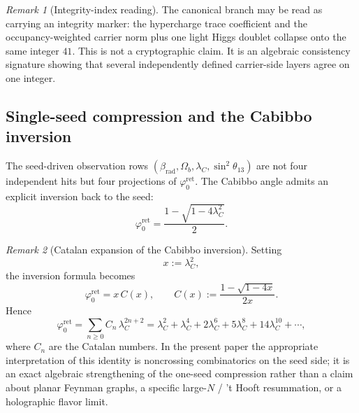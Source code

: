 \documentclass[11pt,a4paper]{article}
\theoremstyle{definition}
\theoremstyle{remark}
\newtheorem*{remark}{Remark}
\newcommand{\phiz}{\varphi_0^{\mathrm{ret}}}
\begin{document}
\begin{remark}[Integrity-index reading]
The canonical branch may be read as carrying an integrity marker: the hypercharge trace coefficient and the occupancy-weighted carrier norm plus one light Higgs doublet collapse onto the same integer $41$. This is not a cryptographic claim. It is an algebraic consistency signature showing that several independently defined carrier-side layers agree on one integer.
\end{remark}

\subsection{Single-seed compression and the Cabibbo inversion}

The seed-driven observation rows $(\beta_{\mathrm{rad}},\Omega_b,\lambda_C,\sin^2\theta_{13})$
are not four independent hits but four projections of $\phiz$. The Cabibbo angle admits an
explicit inversion back to the seed:
\begin{equation}
\label{eq:cabibbo-inversion}
\phiz=\frac{1-\sqrt{1-4\lambda_C^2}}{2}.
\end{equation}
\begin{remark}[Catalan expansion of the Cabibbo inversion]
Setting
\[
x:=\lambda_C^2,
\]
the inversion formula becomes
\[
\phiz=x\,C(x),
\qquad
C(x):=\frac{1-\sqrt{1-4x}}{2x}.
\]
Hence
\begin{equation}
\label{eq:catalan-cabibbo}
\phiz
=
\sum_{n\ge 0} C_n\,\lambda_C^{2n+2}
=
\lambda_C^2+\lambda_C^4+2\lambda_C^6+5\lambda_C^8+14\lambda_C^{10}+\cdots,
\end{equation}
where $C_n$ are the Catalan numbers. In the present paper the appropriate interpretation of this
identity is noncrossing combinatorics on the seed side; it is an exact algebraic strengthening of
the one-seed compression rather than a claim about planar Feynman graphs, a specific large-$N$ /
't Hooft resummation, or a holographic flavor limit.
\end{remark}
\end{document}

